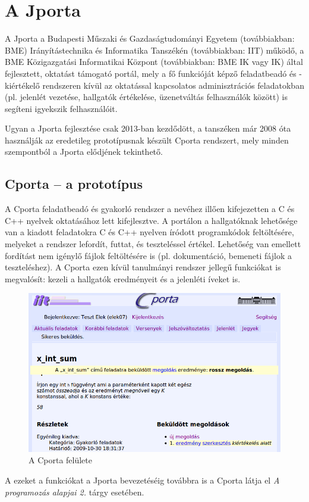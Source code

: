 \chapter{A Jporta}\label{chapter:jporta}

A Jporta a Budapesti Műszaki és Gazdaságtudományi Egyetem (továbbiakban: BME) Irányítástechnika és Informatika Tanszékén (továbbiakban: IIT) működő, a BME Közigazgatási Informatikai Központ (továbbiakban: BME IK vagy IK) által fejlesztett, oktatást támogató portál, mely a fő funkcióját képző feladatbeadó és -kiértékelő rendszeren kívül az oktatással kapcsolatos adminisztrációs feladatokban (pl. jelenlét vezetése, hallgatók értékelése, üzenetváltás felhasználók között) is segíteni igyekszik felhasználóit.

Ugyan a Jporta fejlesztése csak 2013-ban kezdődött, a tanszéken már 2008 óta használják az eredetileg prototípusnak készült Cporta rendszert, mely minden szempontból a Jporta elődjének tekinthető.

\section{Cporta -- a prototípus}
A Cporta feladatbeadó és gyakorló rendszer a nevéhez illően kifejezetten a C és C++ nyelvek oktatásához lett kifejlesztve.
A portálon a hallgatóknak lehetősége van a kiadott feladatokra C és C++ nyelven íródott programkódok feltöltésére, melyeket a rendszer lefordít, futtat, és teszteléssel értékel.
Lehetőség van emellett fordítást nem igénylő fájlok feltöltésére is (pl. dokumentáció, bemeneti fájlok a teszteléshez).
A Cporta ezen kívül tanulmányi rendszer jellegű funkciókat is megvalósít: kezeli a hallgatók eredményeit és a jelenléti íveket is.
\cite{Ory13}
\begin{figure}
    \centering
    \includegraphics[width=\textwidth]{figures/Cporta}
    \caption{A Cporta felülete}
\end{figure}
A ezeket a funkciókat a Jporta bevezetéséig továbbra is a Cporta látja el \textit{A programozás alapjai 2.} tárgy esetében.

